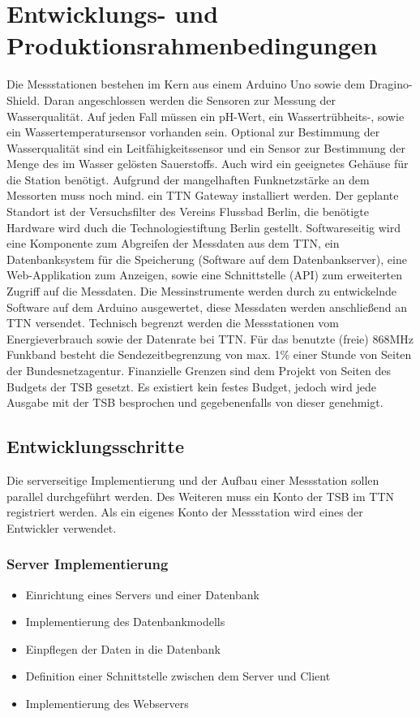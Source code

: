 \section{Entwicklungs- und Produktionsrahmenbedingungen}

Die Messstationen bestehen im Kern aus einem Arduino Uno sowie dem Dragino-Shield. Daran angeschlossen werden die Sensoren zur Messung der Wasserqualität. Auf jeden Fall müssen ein pH-Wert, ein Wassertrübheits-, sowie ein Wassertemperatursensor vorhanden sein. Optional zur Bestimmung der Wasserqualität sind ein Leitfähigkeitssensor und ein Sensor zur Bestimmung der Menge des im Wasser gelösten Sauerstoffs. Auch wird ein geeignetes Gehäuse für die Station benötigt.\newline
Aufgrund der mangelhaften Funknetzstärke an dem Messorten muss noch mind. ein TTN Gateway installiert werden. Der geplante Standort ist der Versuchsfilter des Vereins Flussbad Berlin, die benötigte Hardware wird duch die Technologiestiftung Berlin gestellt. Softwareseitig wird eine Komponente zum Abgreifen der Messdaten aus dem TTN, ein Datenbanksystem für die Speicherung (Software auf dem Datenbankserver), eine Web-Applikation zum Anzeigen, sowie eine Schnittstelle (API) zum erweiterten Zugriff auf die Messdaten. Die Messinstrumente werden durch zu entwickelnde Software auf dem Arduino ausgewertet, diese Messdaten werden anschließend an TTN versendet.\newline
Technisch begrenzt werden die Messstationen vom Energieverbrauch sowie der Datenrate bei TTN. Für das benutzte (freie) 868MHz Funkband besteht die Sendezeitbegrenzung von max. 1\% einer Stunde von Seiten der Bundesnetzagentur.\newline
Finanzielle Grenzen sind dem Projekt von Seiten des Budgets der TSB gesetzt. Es existiert kein festes Budget, jedoch wird jede Ausgabe mit der TSB besprochen und gegebenenfalls von dieser genehmigt.

\subsection{Entwicklungsschritte}

Die serverseitige Implementierung und der Aufbau einer Messstation sollen parallel durchgeführt werden. Des Weiteren muss ein Konto der TSB im TTN registriert werden. Als ein eigenes Konto der Messstation wird eines der Entwickler verwendet.

\subsubsection{Server Implementierung}
\begin{itemize}
	\item Einrichtung eines Servers und einer Datenbank
	\item Implementierung des Datenbankmodells
	\item Einpflegen der Daten in die Datenbank
	\item Definition einer Schnittstelle zwischen dem Server und Client
	\item Implementierung des Webservers
\end{itemize}

